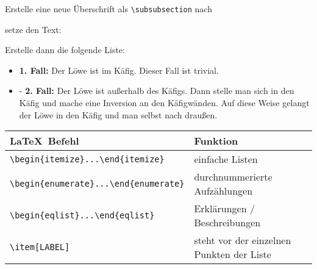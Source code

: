 \documentclass["WS\space 16-17\space -\space LaTeX-Kurs\space -\space Praesentation\space -\space 2.tex"]{subfiles}
\begin{document}
\begin{frame}[fragile]
	\vspace{-0.1cm}
	\Aufgabee
		Erstelle eine neue Überschrift als \lstinline[basicstyle=\normalfont\normalsize]|\subsubsection| nach 
		
		\textrm{}
		
		setze den Text:
		
		\textrm{}
		
		Erstelle dann die folgende Liste:\vspace{-0.1cm}
		\begin{outputbox}
			\vspace{-0.3cm}
			\begin{itemize}
				\item[-]
					\textbf{1. Fall:} Der Löwe ist im Käfig. Dieser Fall ist trivial.
				\item[-]
					\textbf{2. Fall:} Der Löwe ist außerhalb des Käfigs. Dann stelle man sich in den Käfig und mache eine Inversion an den Käfigwänden. Auf diese Weise gelangt der Löwe in den Käfig und man selbst nach draußen.
			\end{itemize}
			\vspace{-0.3cm}
		\end{outputbox}
	\btVFill
	\Befehle
		\vspace{0.1cm}
		\begin{center}
			\begin{tabular}{ll}
				\toprule
				\LaTeX\ Befehl										&	Funktion									\\ \midrule
				\lstinline|\begin{itemize}...\end{itemize}|			&	einfache Listen								\\
				\lstinline|\begin{enumerate}...\end{enumerate}|		&	durchnummerierte Aufzählungen				\\
				\lstinline|\begin{eqlist}...\end{eqlist}|			&	Erklärungen / Beschreibungen				\\
				\lstinline|\item[LABEL]|							&	steht vor der einzelnen Punkten der Liste	\\
				\bottomrule
			\end{tabular}
		\end{center}
		\vspace{0.1cm}
\end{frame}
\end{document}
